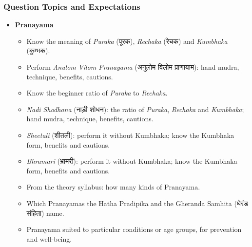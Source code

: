 \begin{frame}[fragile]\frametitle{Question Topics and Expectations}
    \begin{itemize}
        \item \textbf{Pranayama}
        \begin{itemize}
            \item Know the meaning of \textit{Puraka} (पूरक), \textit{Rechaka} (रेचक) and \textit{Kumbhaka} (कुम्भक).
            \item Perform \textit{Anulom Vilom Pranayama} (अनुलोम विलोम प्राणायाम): hand mudra, technique, benefits, cautions.
            \item Know the beginner ratio of \textit{Puraka} to \textit{Rechaka}.
            \item \textit{Nadi Shodhana} (नाड़ी शोधन): the ratio of \textit{Puraka}, \textit{Rechaka} and \textit{Kumbhaka}; hand mudra, technique, benefits, cautions.
            \item \textit{Sheetali} (शीतली): perform it without Kumbhaka; know the Kumbhaka form, benefits and cautions.
            \item \textit{Bhramari} (भ्रामरी): perform it without Kumbhaka; know the Kumbhaka form, benefits and cautions.
            \item From the theory syllabus: how many kinds of Pranayama.
            \item Which Pranayamas the Hatha Pradipika and the Gheranda Samhita (घेरंड संहिता) name.
            \item Pranayama suited to particular conditions or age groups, for prevention and well-being.
        \end{itemize}		
    \end{itemize}
\end{frame}



